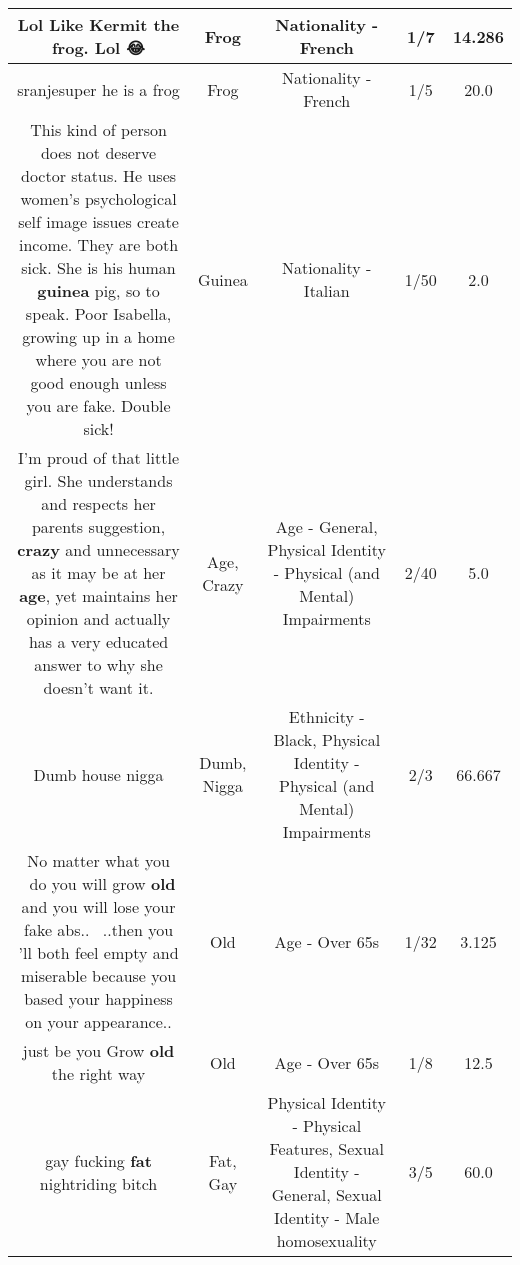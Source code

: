 \documentclass[11pt]{article}
\newlength\mylength
\begin{document}
\begin{center}
\begin{longtable}{|C{.65\mylength}|C{.30\mylength}|C{.12\mylength}|C{.12\mylength}|C{.12\mylength}|}
  \small Lol Like Kermit the \textbf{frog}. Lol 😂\normalsize   & Frog & Nationality - French & 1/7 & 14.286 \\  \hline
  \small sranjesuper he is a frog\normalsize   & Frog & Nationality - French & 1/5 & 20.0 \\  \hline
  \small This kind of person does not deserve doctor status. He uses women's psychological self image issues create income. They are both sick. She is his human \textbf{guinea} pig, so to speak. Poor Isabella, growing up in a home where you are not good enough unless you are fake. Double sick!\normalsize   & Guinea & Nationality - Italian & 1/50 & 2.0 \\  \hline
  \small I'm proud of that little girl. She understands and respects her parents suggestion, \textbf{crazy} and unnecessary as it may be at her \textbf{age}, yet maintains her opinion and actually has a very educated answer to why she doesn't want it.\normalsize   & Age, Crazy & Age - General, Physical Identity - Physical (and Mental) Impairments & 2/40 & 5.0 \\  \hline
  \small Dumb house nigga\normalsize   & Dumb, Nigga & Ethnicity - Black, Physical Identity - Physical (and Mental) Impairments & 2/3 & 66.667 \\  \hline
  \small No matter what you  do you will grow \textbf{old} and you will lose your fake abs..  ..then you 'll both feel empty and miserable because you based your happiness on your appearance..\normalsize   & Old & Age - Over 65s & 1/32 & 3.125 \\  \hline
  \small just be you Grow \textbf{old} the right way\normalsize   & Old & Age - Over 65s & 1/8 & 12.5 \\  \hline
  \small gay fucking \textbf{fat} nightriding bitch\normalsize   & Fat, Gay & Physical Identity - Physical Features, Sexual Identity - General, Sexual Identity - Male homosexuality & 3/5 & 60.0 \\  \hline

\end{longtable}
\end{center}
\end{document}
